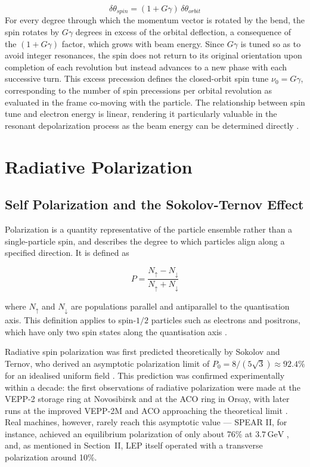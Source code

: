 \documentclass[%
 aip,
 amsmath,amssymb,
 reprint,%
superscriptaddress
]{revtex4-2}
\begin{document}
\begin{equation}
\delta\theta_{spin} = (1+G\gamma)\,\delta\theta_{orbit}
\end{equation}
For every degree through which the momentum vector is rotated by the bend, the spin rotates by $G\gamma$ degrees in excess of the orbital deflection, a consequence of the $(1+G\gamma)$ factor, which grows with beam energy.
Since $G\gamma$ is tuned so as to avoid integer resonances, the spin does not return to its original orientation upon completion of each revolution but instead advances to a new phase with each successive turn\cite{zara_berglund_2001}.
This excess precession defines the closed-orbit spin tune $\nu_0 = G\gamma$, corresponding to the number of spin precessions per orbital revolution as evaluated in the frame co-moving with the particle\cite{meot_huang_ptitsyn_lin_2023, huang_2019}.
The relationship between spin tune and electron energy is linear, rendering it particularly valuable in the resonant depolarization process as the beam energy can be determined directly \cite{meot_huang_ptitsyn_lin_2023,keintzel_wu_kiel_sagan_wilkinson_oide_bauche_hofle_blondel_jiang_2025}.
\section{Radiative Polarization}

\subsection{Self Polarization and the Sokolov-Ternov Effect}

Polarization is a quantity representative of the particle ensemble rather than a single-particle spin, and describes the degree to which particles align along a specified direction. It is defined as 

\begin{equation}
P=\frac{N_{\uparrow} - N_{\downarrow}}{N_{\uparrow} + N_{\downarrow}}
\end{equation}


where $N_{\uparrow}$ and $N_{\downarrow}$ are populations parallel and antiparallel to the quantisation axis\cite{meot_huang_ptitsyn_lin_2023}.
This definition applies to spin-$1/2$ particles such as electrons and positrons, which have only two spin states along the quantisation axis \cite{Buon269521,meot_huang_ptitsyn_lin_2023}.

Radiative spin polarization was first predicted theoretically by Sokolov and Ternov, who derived an asymptotic polarization limit of 
$P_0=8/(5\sqrt{3})\approx92.4\%$ for an idealised uniform field \cite{sokolov_ternov_1963}. This prediction was confirmed experimentally within a decade: the first observations of radiative polarization were made at the VEPP-2 storage ring at Novosibirsk and at the ACO ring in Orsay, with later runs at the improved VEPP-2M and ACO approaching the theoretical limit \cite{baier_2006,Buon269521}. Real machines, however, rarely reach this asymptotic value — SPEAR II, for instance, achieved an equilibrium polarization of only about 76\% at $3.7\,\text{GeV}$ \cite{mane2025radiativespinpolarizationhigh}, and, as mentioned in Section~II, LEP itself operated with a transverse polarization around 10\%.
\end{document}
